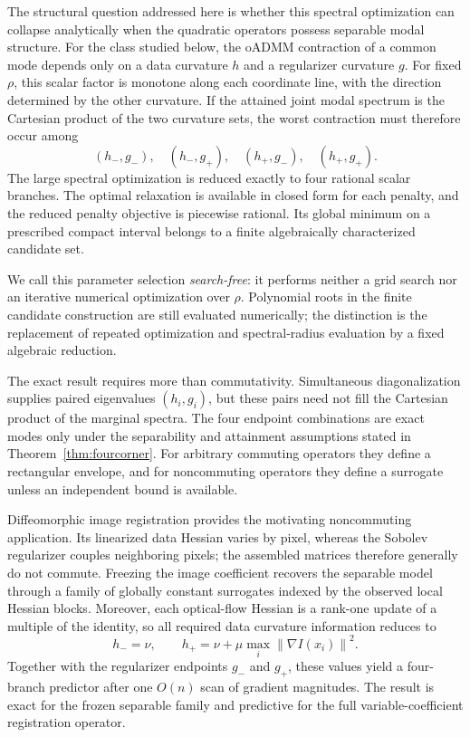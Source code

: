 \documentclass[11pt]{article}
\theoremstyle{definition}
\newcommand{\norm}[1]{\left\lVert #1\right\rVert}
\begin{document}
The structural question addressed here is whether this spectral optimization
can collapse analytically when the quadratic operators possess separable modal
structure. For the class studied below, the oADMM contraction of a common mode
depends only on a data curvature $h$ and a regularizer curvature $g$. For fixed
$\rho$, this scalar factor is monotone along each coordinate line, with the
direction determined by the other curvature. If the
attained joint modal spectrum is the Cartesian product of the two curvature
sets, the worst contraction must therefore occur among
\[
(h_-,g_-),\quad(h_-,g_+),\quad(h_+,g_-),\quad(h_+,g_+).
\]
The large spectral optimization is reduced exactly to four rational scalar
branches. The optimal relaxation is available in closed form for each
penalty, and the reduced penalty objective is piecewise rational. Its global
minimum on a prescribed compact interval belongs to a finite algebraically
characterized candidate set.

We call this parameter selection \emph{search-free}: it performs neither a
grid search nor an iterative numerical optimization over $\rho$. Polynomial
roots in the finite candidate construction are still evaluated numerically;
the distinction is the replacement of repeated optimization and
spectral-radius evaluation by a fixed algebraic reduction.

The exact result requires more than commutativity. Simultaneous
diagonalization supplies paired eigenvalues $(h_i,g_i)$, but these pairs need
not fill the Cartesian product of the marginal spectra. The four endpoint
combinations are exact modes only under the separability and attainment
assumptions stated in Theorem~\ref{thm:fourcorner}. For arbitrary commuting
operators they define a rectangular envelope, and for noncommuting operators
they define a surrogate unless an independent bound is available.

Diffeomorphic image registration provides the motivating noncommuting
application. Its linearized data Hessian varies by pixel, whereas the Sobolev
regularizer couples neighboring pixels; the assembled matrices therefore
generally do not commute. Freezing the image coefficient recovers the separable
model through a family of globally constant surrogates indexed by the observed
local Hessian blocks. Moreover, each optical-flow Hessian is a rank-one update
of a multiple of the identity, so all required data curvature information
reduces to
\[
h_-=\nu,\qquad h_+=\nu+\mu\max_i\norm{\nabla I(x_i)}^2.
\]
Together with the regularizer endpoints $g_-$ and $g_+$, these values yield a
four-branch predictor after one $O(n)$ scan of gradient magnitudes. The result
is exact for the frozen separable family and predictive for the full
variable-coefficient registration operator.
\end{document}
